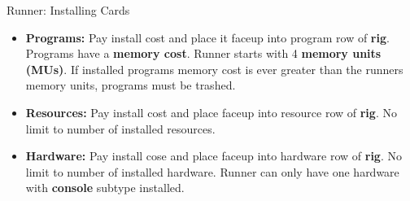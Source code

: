 \documentclass[12pt]{article}
\newenvironment{itemizeCustom}
{\begin{itemize}
  \setlength{\itemsep}{1pt}
  \setlength{\parskip}{0pt}
  \setlength{\parsep}{0pt}}
{\end{itemize}}
\begin{document}
\begin{multicols*}{2}
Runner: Installing Cards
\begin{itemizeCustom}
	\item \textbf{Programs:} Pay install cost and place it faceup into program row of \textbf{rig}. Programs have a \textbf{memory cost}. Runner starts with 4 \textbf{memory units (MUs)}. If installed programs memory cost is ever greater than the runners memory units, programs must be trashed.
	\item \textbf{Resources:} Pay install cost and place faceup into resource row of \textbf{rig}. No limit to number of installed resources.
	\item \textbf{Hardware:} Pay install cose and place faceup into hardware row of \textbf{rig}. No limit to number of installed hardware. Runner can only have one hardware with \textbf{console} subtype installed.
\end{itemizeCustom}


\end{multicols*}
\end{document}
